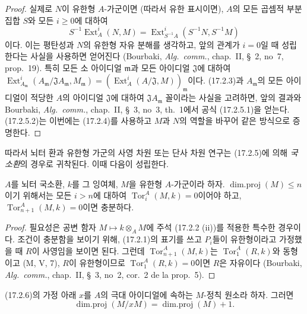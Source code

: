 \begin{proof}
실제로 $N$이 유한형 $A$-가군이면 (따라서 유한 표시이면), $A$의 모든
곱셈적 부분집합 $S$와 모든 $i\geq0$에 대하여
\[
  S^{-1}\operatorname{Ext}^i_A(N,M)
  =\operatorname{Ext}^i_{S^{-1}A}(S^{-1}N,S^{-1}M)
\]
이다. 이는 평탄성과 $N$의 유한형 자유 분해를 생각하고, 앞의 관계가
$i=0$일 때 성립한다는 사실을 사용하면 얻어진다 (Bourbaki,
\emph{Alg.~comm.}, chap.~II, \S~2, no~7, prop.~19). 특히 모든 소
아이디얼 $\mathfrak{m}$과 모든 아이디얼 $\mathfrak{J}$에 대하여
$\operatorname{Ext}^i_{A_{\mathfrak{m}}}
(A_{\mathfrak{m}}/\mathfrak{J}A_{\mathfrak{m}},M_{\mathfrak{m}})
=(\operatorname{Ext}^i_A(A/\mathfrak{J},M))_{\mathfrak{m}}$이다.
(17.2.3)과 $A_{\mathfrak{m}}$의 모든 아이디얼이 적당한 $A$의
아이디얼 $\mathfrak{J}$에 대하여
$\mathfrak{J}A_{\mathfrak{m}}$ 꼴이라는 사실을 고려하면,
앞의 결과와 Bourbaki, \emph{Alg.~comm.}, chap.~II, \S~3, no~3,
th.~1에서 공식 (17.2.5.1)을 얻는다. (17.2.5.2)는 이번에는 (17.2.4)를
사용하고 $M$과 $N$의 역할을 바꾸어 같은 방식으로 증명한다.
\end{proof}

따라서 뇌터 환과 유한형 가군의 사영 차원 또는 단사 차원 연구는
(17.2.5)에 의해 \emph{국소환}의 경우로 귀착된다. 이때 다음이 성립한다.

\begin{lemma}[17.2.6]
\label{0.17.2.6-fr}
$A$를 뇌터 국소환, $k$를 그 잉여체, $M$을 유한형 $A$-가군이라 하자.
$\operatorname{dim.proj}(M)\leq n$이기 위해서는 모든 $i>n$에 대하여
$\operatorname{Tor}^A_i(M,k)=0$이어야 하고,
$\operatorname{Tor}^A_{n+1}(M,k)=0$이면 충분하다.
\end{lemma}

\begin{proof}
필요성은 공변 함자 $M\mapsto k\otimes_A M$에 주석 (17.2.2 (ii))를
적용한 특수한 경우이다. 조건이 충분함을 보이기 위해, (17.2.1)의 표기를
쓰고 $P_i$들이 유한형이라고 가정했을 때 $R$이 사영임을 보이면 된다.
그런데 $\operatorname{Tor}^A_{n+1}(M,k)$는
$\operatorname{Tor}^A_1(R,k)$와 동형이고 (M, V, 7), $R$이 유한형이므로
$\operatorname{Tor}^A_1(R,k)=0$이면 $R$은 자유이다 (Bourbaki,
\emph{Alg.~comm.}, chap.~II, \S~3, no~2, cor.~2 de la prop.~5).
\end{proof}

\begin{corollary}[17.2.7]
\label{0.17.2.7-fr}
(17.2.6)의 가정 아래 $x$를 $A$의 극대 아이디얼에 속하는
$M$-정칙 원소라 하자. 그러면
\begin{equation}
\label{0.17.2.7.1-fr}
\tag{17.2.7.1}
  \operatorname{dim.proj}(M/xM)=\operatorname{dim.proj}(M)+1.
\end{equation}
\end{corollary}

